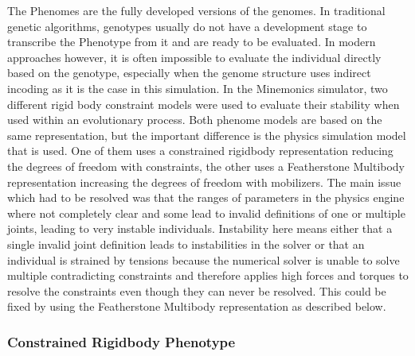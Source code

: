\documentclass[main]{subfiles}
\begin{document}
The Phenomes are the fully developed versions of the genomes. In traditional genetic algorithms, genotypes usually do not have a development stage to transcribe the Phenotype from it and are ready to be evaluated. In modern approaches however, it is often impossible to evaluate the individual directly based on the genotype, especially when the genome structure uses indirect incoding as it is the case in this simulation.
In the Minemonics simulator, two different rigid body constraint models were used to evaluate their stability when used within an evolutionary process. Both phenome models are based on the same representation, but the important difference is the physics simulation model that is used. One of them uses a constrained rigidbody representation reducing the degrees of freedom with constraints, the other uses a Featherstone Multibody representation increasing the degrees of freedom with mobilizers. The main issue which had to be resolved was that the ranges of parameters in the physics engine where not completely clear and some lead to invalid definitions of one or multiple joints, leading to very instable individuals. Instability here means either that a single invalid joint definition leads to instabilities in the solver or that an individual is strained by tensions because the numerical solver is unable to solve multiple contradicting constraints and therefore applies high forces and torques to resolve the constraints even though they can never be resolved. This could be fixed by using the Featherstone Multibody representation as described below. 

\subsubsection{Constrained Rigidbody Phenotype}
\end{document}
